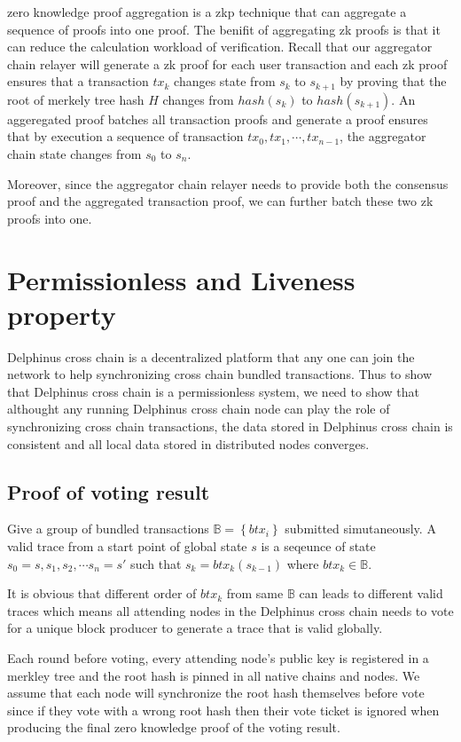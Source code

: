 \documentclass[acmtog, natbib=false]{acmart}
\begin{document}
zero knowledge proof aggregation is a zkp technique that can aggregate a sequence of proofs into one proof. The benifit of aggregating zk proofs is that it can reduce the calculation workload of verification. Recall that our aggregator chain relayer will generate a zk proof for each user transaction and each zk proof ensures that a transaction $tx_k$ changes state from $s_k$ to $s_{k+1}$ by proving that the root of merkely tree hash $H$ changes from $hash(s_k)$ to $hash(s_{k+1})$. An aggeregated proof batches all transaction proofs and generate a proof ensures that by execution a sequence of transaction $tx_0, tx_1, \cdots, tx_{n-1}$, the aggregator chain state changes from $s_0$ to $s_n$. 

Moreover, since the aggregator chain relayer needs to provide both the consensus proof and the aggregated transaction proof, we can further batch these two zk proofs into one.


\section {Permissionless and Liveness property}
\label{permissionless-liveness}

Delphinus cross chain is a decentralized platform that any one can join the network to help synchronizing cross chain bundled transactions. Thus to show that Delphinus cross chain is a permissionless system, we need to show that althought any running Delphinus cross chain node can play the role of synchronizing cross chain transactions, the data stored in Delphinus cross chain is consistent and all local data stored in distributed nodes converges.

\subsection{Proof of voting result}
Give a group of bundled transactions $\mathbb{B} = \left\{btx_i\right\}$ submitted simutaneously. A valid trace from a start point of global state $s$ is a seqeunce of state $s_0=s, s_1, s_2, \cdots s_n = s'$ such that $s_k = btx_k(s_{k-1})$ where $btx_k \in \mathbb{B}$.

It is obvious that different order of $btx_k$ from same $\mathbb{B}$ can leads to different valid traces which means all attending nodes in the Delphinus cross chain needs to vote for a unique block producer to generate a trace that is valid globally.

Each round before voting, every attending node's public key is registered in a merkley tree and the root hash is pinned in all native chains and nodes. We assume that each node will synchronize the root hash themselves before vote since if they vote with a wrong root hash then their vote ticket is ignored when producing the final zero knowledge proof of the voting result.
\end{document}
